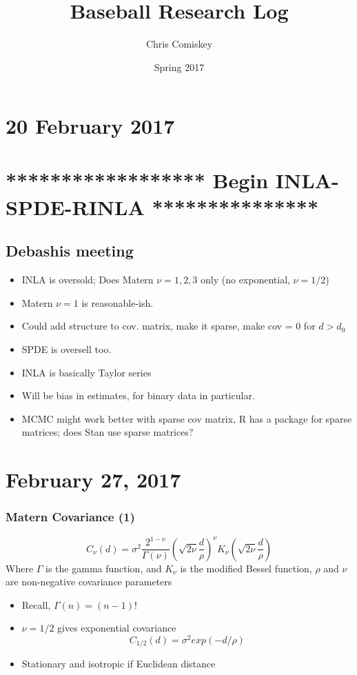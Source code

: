 \documentclass{article}
\title{Baseball Research Log}
\author{Chris Comiskey}
\date{Spring 2017}
\begin{document}
\maketitle{}

\section*{20 February 2017}

\section*{****************** Begin INLA-SPDE-RINLA ***************}

\subsection*{Debashis meeting}
\begin{itemize}
\item INLA is oversold; Does Matern $\nu = 1, 2, 3$ only (no exponential, $\nu = 1/2$)
\item Matern $\nu = 1$ is reasonable-ish.
\item Could add structure to cov. matrix, make it sparse, make cov = 0 for $d > d_{0}$
\item SPDE is oversell too.
\item INLA is basically Taylor series
\item Will be bias in estimates, for binary data in particular.
\item MCMC might work better with sparse cov matrix, R has a package for sparse matrices; does Stan use sparse matrices?
\end{itemize}

\section*{February 27, 2017}

\subsubsection*{Matern Covariance (1)}
$$ C_{\nu}(d) = \sigma^{2} \frac{2^{1 - \nu}}{\Gamma(\nu)} \left( \sqrt{2 \nu} \frac{d}{\rho} \right)^{\nu} K_{\nu} \left( \sqrt{2\nu}\frac{d}{\rho} \right) $$
Where $\Gamma$ is the gamma function, and $K_{\nu}$ is the modified Bessel function, $\rho$ and $\nu$ are non-negative covariance parameters
\begin{itemize}
\item Recall, $\Gamma(n) = (n-1)!$
\item $\nu = 1/2$ gives exponential covariance
$$C_{1/2}(d) = \sigma^{2} exp(-d/\rho)$$
\item Stationary and isotropic if Euclidean distance
\end{itemize}
\end{document}
